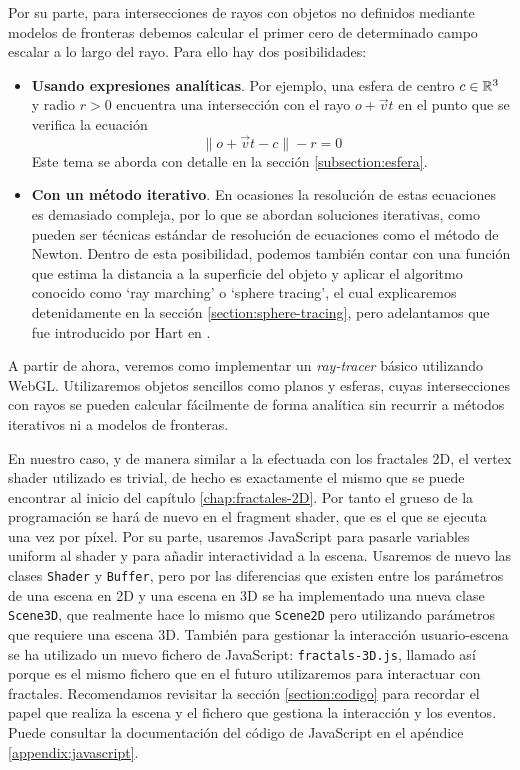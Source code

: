 Por su parte, para intersecciones de rayos con objetos no definidos mediante modelos de fronteras debemos calcular el primer cero de determinado campo escalar a lo largo del rayo. Para ello hay dos posibilidades:
\begin{itemize}
    \item \textbf{Usando expresiones analíticas}. Por ejemplo, una esfera de centro $c\in\mathbb{R}^3$ y radio $r>0$ encuentra una intersección con el rayo $o+\vec v t$ en el punto que se verifica la ecuación
    $$
    \|o+\vec v t - c\| - r = 0
    $$
    Este tema se aborda con detalle en la sección \ref{subsection:esfera}.
    \item \textbf{Con un método iterativo}. En ocasiones la resolución de estas ecuaciones es demasiado compleja, por lo que se abordan soluciones iterativas, como pueden ser técnicas estándar de resolución de ecuaciones como el método de Newton. Dentro de esta posibilidad, podemos también contar con una función que estima la distancia a la superficie del objeto y aplicar el algoritmo conocido como `ray marching' o `sphere tracing', el cual explicaremos detenidamente en la sección \ref{section:sphere-tracing}, pero adelantamos que fue introducido por Hart en \cite{Hart-1995}.
\end{itemize}


A partir de ahora, veremos como implementar un \textit{ray-tracer} básico utilizando WebGL. Utilizaremos objetos sencillos como planos y esferas, cuyas intersecciones con rayos se pueden calcular fácilmente de forma analítica sin recurrir a métodos iterativos ni a modelos de fronteras.

En nuestro caso, y de manera similar a la efectuada con los fractales 2D, el vertex shader utilizado es trivial, de hecho es exactamente el mismo que se puede encontrar al inicio del capítulo \ref{chap:fractales-2D}. Por tanto el grueso de la programación se hará de nuevo en el fragment shader, que es el que se ejecuta una vez por píxel. Por su parte, usaremos JavaScript para pasarle variables uniform al shader y para añadir interactividad a la escena. Usaremos de nuevo las clases \verb|Shader| y \verb|Buffer|, pero por las diferencias que existen entre los parámetros de una escena en 2D y una escena en 3D se ha implementado una nueva clase \verb|Scene3D|, que realmente hace lo mismo que \verb|Scene2D| pero utilizando parámetros que requiere una escena 3D. También para gestionar la interacción usuario-escena se ha utilizado un nuevo fichero de JavaScript: \verb|fractals-3D.js|, llamado así porque es el mismo fichero que en el futuro utilizaremos para interactuar con fractales. Recomendamos revisitar la sección \ref{section:codigo} para recordar el papel que realiza la escena y el fichero que gestiona la interacción y los eventos. Puede consultar la documentación del código de JavaScript en el apéndice \ref{appendix:javascript}.

